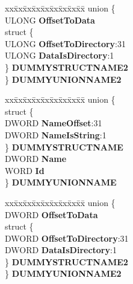 \begin{DoxyCompactItemize}
\begin{tabbing}
\end{tabbing}\item 
\mbox{\label{struct___i_m_a_g_e___r_e_s_o_u_r_c_e___d_i_r_e_c_t_o_r_y___e_n_t_r_y_aa06a58106166b96b05002fdd422687fb}} 
\begin{tabbing}
xx\=xx\=xx\=xx\=xx\=xx\=xx\=xx\=xx\=\kill
union \{\\
\>ULONG {\bfseries OffsetToData}\\
\>struct \{\\
\>\>ULONG {\bfseries OffsetToDirectory}:31\\
\>\>ULONG {\bfseries DataIsDirectory}:1\\
\>\} {\bfseries DUMMYSTRUCTNAME2}\\
\} {\bfseries DUMMYUNIONNAME2}\\

\end{tabbing}\item 
\mbox{\label{struct___i_m_a_g_e___r_e_s_o_u_r_c_e___d_i_r_e_c_t_o_r_y___e_n_t_r_y_aa4dc1d13d51c6c04b2ecce56c35fa83b}} 
\begin{tabbing}
xx\=xx\=xx\=xx\=xx\=xx\=xx\=xx\=xx\=\kill
union \{\\
\>struct \{\\
\>\>DWORD {\bfseries NameOffset}:31\\
\>\>DWORD {\bfseries NameIsString}:1\\
\>\} {\bfseries DUMMYSTRUCTNAME}\\
\>DWORD {\bfseries Name}\\
\>WORD {\bfseries Id}\\
\} {\bfseries DUMMYUNIONNAME}\\

\end{tabbing}\item 
\mbox{\label{struct___i_m_a_g_e___r_e_s_o_u_r_c_e___d_i_r_e_c_t_o_r_y___e_n_t_r_y_aa2383e8cec802c146a385e5122623cc6}} 
\begin{tabbing}
xx\=xx\=xx\=xx\=xx\=xx\=xx\=xx\=xx\=\kill
union \{\\
\>DWORD {\bfseries OffsetToData}\\
\>struct \{\\
\>\>DWORD {\bfseries OffsetToDirectory}:31\\
\>\>DWORD {\bfseries DataIsDirectory}:1\\
\>\} {\bfseries DUMMYSTRUCTNAME2}\\
\} {\bfseries DUMMYUNIONNAME2}\\

\end{tabbing}\end{DoxyCompactItemize}


